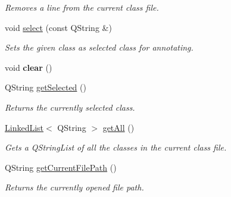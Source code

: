 \begin{DoxyCompactItemize}
\begin{DoxyCompactList}\small\item\em Removes a line from the current class file. \end{DoxyCompactList}\item 
void \hyperlink{classClassModel_aa8c0739232fabe2dc589247155d4e49a}{select} (const Q\+String \&)
\begin{DoxyCompactList}\small\item\em Sets the given class as selected class for annotating. \end{DoxyCompactList}\item 
\mbox{\label{classClassModel_ab67eab09542dc254103a72e7b1137f90}} 
void {\bfseries clear} ()
\item 
Q\+String \hyperlink{classClassModel_ab7ca25c9d73597d671bfbb1c34f92461}{get\+Selected} ()
\begin{DoxyCompactList}\small\item\em Returns the currently selected class. \end{DoxyCompactList}\item 
\mbox{\label{classClassModel_a38848b27dc86ca12fa4006c2ac53aa2f}} 
\hyperlink{classLinkedList}{Linked\+List}$<$ Q\+String $>$ \hyperlink{classClassModel_a38848b27dc86ca12fa4006c2ac53aa2f}{get\+All} ()
\begin{DoxyCompactList}\small\item\em Gets a Q\+String\+List of all the classes in the current class file. \end{DoxyCompactList}\item 
\mbox{\label{classClassModel_aa952e5109a5246d443f7e83f8a7d75ac}} 
Q\+String \hyperlink{classClassModel_aa952e5109a5246d443f7e83f8a7d75ac}{get\+Current\+File\+Path} ()
\begin{DoxyCompactList}\small\item\em Returns the currently opened file path. \end{DoxyCompactList}\end{DoxyCompactItemize}
